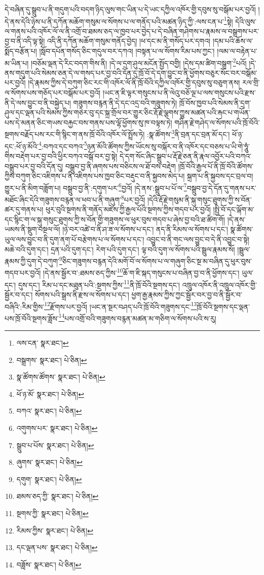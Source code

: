 དེ་བཞིན་དུ་སྒྲུབ་པ་ནི་གདུག་པའི་བདག་ཉིད་ལུས་གང་ཡིན་པ་དེ་ཡང་དཀྱིལ་འཁོར་གྱི་དབུས་སུ་བསྒོམ་པར་བྱའོ། །དེ་ནས་དེའི་ཉེས་པ་ནི་དཀོན་མཆོག་གསུམ་ལ་སོགས་པ་ལ་གནོད་པའི་མཚན་ཉིད་ཀྱི་:ལས་ངན་པ་\footnote{ལས་ངན་  སྣར་ཐང་། }སྟེ། དེའི་ལུས་ལ་གནས་པའི་འཁོར་ལོ་ལ་ནི་འགྲོ་བ་ཐམས་ཅད་ལ་ཁྱབ་པར་བྱེད་པ་དེ་བཞིན་གཤེགས་པ་རྣམས་ལ་བསྒྲགས་པར་བྱ་བ་ནི་འདི་ལྟ་སྟེ། འདི་ནི་དཀོན་མཆོག་གསུམ་གནོད་བྱེད། །ཕ་དང་མ་ནི་གསོད་པར་དགའ། །དམ་པའི་ཆོས་ལ་སྨོད་བརྩོན་པ། །སློབ་དཔོན་གསོད་ཅིང་གདུལ་བར་དཀའ། །བསྟན་པ་ལ་སོགས་རིམ་པས་ཀྱང་། །ལམ་ལ་བརྟེན་པ་མ་ཡིན་པ། །བཅོམ་ལྡན་དེ་རིང་བདག་གིས་ནི། །དེ་ལ་དྲག་ཤུལ་མངོན་སྤྱོད་བགྱི། །དེས་དམ་ཚིག་བསྒྲག་\footnote{བསྒྲགས་  སྣར་ཐང་།  པེ་ཅིན། }པའོ། །དེ་ནས་གདུག་པའི་སེམས་ཅན་དེ་ལ་གསད་པར་བྱ་བའི་དོན་དུ་ཁྲོ་བོ་དེ་དག་བྱུང་བ་ནི་ཕྱོགས་བཅུར་སོང་བར་བསྒོམ་པར་བྱའོ། །དེ་རྣམས་ཀྱིས་དེ་བཀུག་ཅིང་རང་གི་འཁོར་ལོ་ནི་ཁྲོ་བོའི་དཀྱིལ་འཁོར་གྱི་དབུས་སུ་བཅུག་ནས། རལ་གྲི་ལ་སོགས་པས་གཅོད་པར་བསྒོམ་པར་བྱའོ། །ཡང་ན་ཇི་ལྟར་གསུངས་པ་ནི་ལེའུ་བཅོ་ལྔ་པ་ལས་གསུངས་པའི་རྫས་ནི་དེ་ལས་བྱུང་བ་ནི་བསྐྱེད་པ། གཟུགས་བརྙན་ནི་དེ་དང་འདྲ་བའི་གཟུགས་ཏེ། ཁྲོ་བོས་ཁྱབ་པའི་སེམས་ནི་དྲག་ཤུལ་དང་ལྡན་པའི་སེམས་ཀྱིས་གཅེར་བུ་དང་སྐྲ་གྲོལ་བར་གྱུར་ཅིང་རྡོ་རྗེ་ལྕགས་ཀྱུས་མཚན་པའི་རྐང་པ་གཡོན་པས་དེ་མནན་ཅིང་གཡས་བརྐྱང་བས་གནས་པས་ལྷོ་ཕྱོགས་སུ་ཁ་བལྟས་ཏེ། གཤིན་རྗེ་གཤེད་ལ་སོགས་པའི་ཁྲོ་བོའི་སྔགས་བརྗོད་པས་རང་གི་སྙིང་ག་ནས་ཁྲོ་བོའི་འཁོར་ལོ་སྤྲོས་ཏེ། :སྣ་ཚོགས་\footnote{སྣ་ཚོགས་ཚོགས་  སྣར་ཐང་།  པེ་ཅིན། }ནི་བྲན་དང་བྲན་མོ་དང་། ཕོ་ཉ་དང་:ཕོ་ཉ་མོའི་\footnote{ཕོ་ཉ་མོ་  སྣར་ཐང་།  པེ་ཅིན། }:བཀའ་དང་བཀའ་\footnote{བཀའ་  སྣར་ཐང་།  པེ་ཅིན། }ཉན་མོའི་ཚོགས་ཀྱིས་ཡོངས་སུ་བསྐོར་བ་ནི་འཁོར་དང་བཅས་པ་ཡི་གེ་ཧཱུཾ་གིས་བརྡེག་པར་བྱ་བའི་ཕྱིར་བཀའ་བསྒོ་བར་བྱ་སྟེ། དེ་དག་སོང་ཞིང་སྒྲུབ་པ་རྡོ་རྗེ་ཅན་ནི་རྣལ་འབྱོར་པའི་བཀའ་བསྒྲུབ་པར་བྱ་བའི་དོན་དུ། བསྒྲུབ་བྱ་ནི་ཞགས་པས་བཅིངས་ལ་ཐོ་བས་བརྡེག །ཁྲོ་བོའི་རྒྱལ་པོ་ནི་ཁྲོ་བོའི་ཚོགས་ཀྱིས་བཀུག་ཅིང་འཇིགས་པ་ནི་འཇིགས་པས་ཁྱབ་ཅིང་བརྡུང་བ་ནི་སྐྱབས་མེད་པ། སྐྲག་པ་ནི་སྐྱབས་དང་བྲལ་བ། གྱུར་པ་ནི་མིག་བཟློག་པ། བསྒྲུབ་བྱ་ནི་:དགུག་པར་\footnote{འགུགས་པར་  སྣར་ཐང་།  པེ་ཅིན། }བྱའོ། །དེ་ནས་:སྒྲུབ་པ་པོ་ལ་\footnote{སྒྲུབ་པ་པོས་  སྣར་ཐང་།  པེ་ཅིན། }བསྒྲུབ་བྱ་དེ་དོན་དུ་གནས་པར་མཐོང་ཞིང་དེའི་གཟུགས་བརྙན་ལ་ཕབ་པ་ནི་གཞུག་\footnote{ཞུགས་  སྣར་ཐང་།  པེ་ཅིན། }པར་བྱའོ། །དེའི་རྡོ་རྗེ་གསུམ་ནི་སྐུ་གསུང་ཐུགས་ཀྱི་ས་བོན་ཚར་དུ་གནས་པ། ཕུར་བུའི་སྔགས་ནི་གནོད་མཛེས་ཀྱི་རྒྱལ་པོའི་སྔགས་ཀྱིས་གདབ་པར་བྱའོ། །སྤྱི་བོ་དང་ལྐོག་མ་དང་སྙིང་ག་ལ་སྐུ་གསུང་ཐུགས་ཀྱི་ས་བོན་གྱི་གཟུགས་ལ་ཕུར་བུས་གདབ་པ་ཞེས་བྱ་བའི་ཐ་ཚིག་གོ། །དེ་ནས་ཡམས་ནི་སྡུག་བསྔལ་ལོ། །ཉེ་བར་འཚེ་བ་ནི་ཤ་ཟ་ལ་སོགས་པ་དང་། ནད་ནི་རིམས་ལ་སོགས་པ་དང་། སྣ་ཚོགས་ཡུལ་ལས་བྱུང་བ་ནི་དུག་ནག་པོ་བརྩེགས་པ་ལ་སོགས་པ་དང་། འབྱུང་བ་ནི་གང་ལས་བྱུང་བ་དེ་ནི་འབྱུང་བ་སྟེ། མཆེ་བའི་དུག་དང་། དྲན་པའི་དུག་དང་། རེག་པའི་དུག་དང་། ལྟ་བའི་དུག་ལ་སོགས་པའི་སྦྲུལ་རྣམས་སོ། །སྦྲུལ་རྣམས་ཀྱི་དུག་དེ་བཀུག་\footnote{དགུག་  སྣར་ཐང་།  པེ་ཅིན། }ཅིང་གཟུགས་བརྙན་དེའི་མགོ་བོ་ལ་སོགས་པ་ལ་གཞུག་ཅིང་སྔ་མ་བཞིན་དུ་ཕུར་བུས་གདབ་པར་བྱའོ། །དེ་ནས་སྦྱོར་བ་:ཐམས་ཅད་ཀྱིས་\footnote{ཐམས་ཅད་ཀྱི་  སྣར་ཐང་།  པེ་ཅིན། }ཆོ་ག་ཇི་སྐད་གསུངས་པ་བཞིན་བྱ་བ་ནི་ཕྱོགས་དང་། ཡུལ་དང་། དུས་དང་། རིམ་པ་དང་མཐུན་པའི་:སྔགས་ཀྱིས་\footnote{སྔགས་ཀྱི་  སྣར་ཐང་།  པེ་ཅིན། }ནི་ཁྲོ་བོའི་སྔགས་དང་། འཁྲུལ་འཁོར་ནི་འཁྲུལ་འཁོར་གྱི་སྦྱོར་བ་དང་། སོགས་པའི་སྒྲས་ནི་རྫས་ལ་སོགས་པ་དང་། ཕྱག་རྒྱ་རྣམས་ཀྱིས་ཀྱང་སྦྱོར་བར་བྱ་བ་ནི་སྦྱོར་བ་བཞིའི་:རིམ་གྱིས་\footnote{རིམས་ཀྱིས་  སྣར་ཐང་།  པེ་ཅིན། }རྫོགས་པར་བྱའོ། །ཡང་ན་སྔར་བཤད་པའི་ཁྲོ་བོའི་གཟུགས་དང་\footnote{དང་ལྡན་པས་  སྣར་ཐང་།  པེ་ཅིན། }ཁྲོ་བོའི་སྔགས་དང་ལྡན་པས་ཁྲོ་བོའི་སྔགས་ཟློས་\footnote{བཟློས་  སྣར་ཐང་།  པེ་ཅིན། }པས་འགྲོ་བའི་གཟུགས་བརྙན་མཚན་མ་གཅིག་ལ་སོགས་པའི་ས་རུ། 